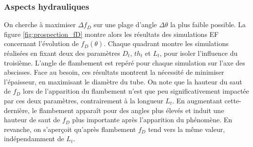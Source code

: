  		\subsubsection{Aspects hydrauliques}
On cherche à maximiser $\Delta f_D$ sur une plage d'angle $\Delta \theta$ la plus faible possible. La figure \ref{fig:prospection_fD} montre alors les résultats des simulations EF concernant l'évolution de $f_D(\theta)$. Chaque quadrant montre les simulations réalisées en fixant deux des paramètres $D_t$, $th_t$ et $L_t$, pour isoler l'influence du troisième. L'angle de flambement est repéré pour chaque simulation sur l'axe des abscisses. Face au besoin, ces résultats montrent la nécessité de minimiser l'épaisseur, en maximisant le diamètre du tube. On note que la hauteur du saut de $f_D$ lors de l'apparition du flambement n'est que peu significativement impactée par ces deux paramètres, contrairement à la longueur $L_t$. En augmentant cette-dernière, le flambement apparaît pour des angles plus élevés et induit une hauteur de saut de $f_D$ plus importante après l'apparition du phénomène. En revanche, on s'aperçoit qu'après flambement $f_D$ tend vers la même valeur, indépendamment de $L_t$.
